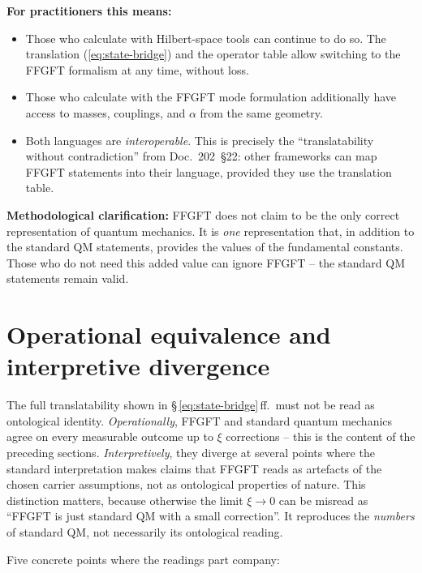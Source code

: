 \textbf{For practitioners this means:}
\begin{itemize}[leftmargin=2em,itemsep=2pt,topsep=2pt]
  \item Those who calculate with Hilbert-space tools can continue to
        do so. The translation (\ref{eq:state-bridge}) and the
        operator table allow switching to the FFGFT formalism at any
        time, without loss.
  \item Those who calculate with the FFGFT mode formulation
        additionally have access to masses, couplings, and $\alpha$
        from the same geometry.
  \item Both languages are \emph{interoperable}. This is precisely
        the \enquote{translatability without contradiction} from
        Doc.~202~§22: other frameworks can map FFGFT statements into
        their language, provided they use the translation table.
\end{itemize}

\textbf{Methodological clarification:} FFGFT does not claim to be
the only correct representation of quantum mechanics. It is
\emph{one} representation that, in addition to the standard QM
statements, provides the values of the fundamental constants. Those
who do not need this added value can ignore FFGFT -- the standard
QM statements remain valid.

\section{Operational equivalence and interpretive divergence}

The full translatability shown in §\,\ref{eq:state-bridge}\,ff.\ must
not be read as ontological identity. \emph{Operationally}, FFGFT and
standard quantum mechanics agree on every measurable outcome up to
$\xi$ corrections -- this is the content of the preceding sections.
\emph{Interpretively}, they diverge at several points where the
standard interpretation makes claims that FFGFT reads as artefacts of
the chosen carrier assumptions, not as ontological properties of
nature. This distinction matters, because otherwise the limit
$\xi \to 0$ can be misread as ``FFGFT is just standard QM with a small
correction''. It reproduces the \emph{numbers} of standard QM, not
necessarily its ontological reading.

Five concrete points where the readings part company:

